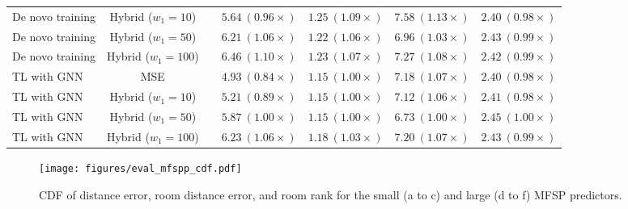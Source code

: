 \begin{table*}[h!]
\begin{tabular}{lcccccc}
        De novo training  & Hybrid ($w_1=10$) &                        & $5.64~(0.96\times)$ & $1.25~(1.09\times)$ & $7.58~(1.13\times)$ & $2.40~(0.98\times)$ \\ %
        De novo training  & Hybrid ($w_1=50$) &                        & $6.21~(1.06\times)$ & $1.22~(1.06\times)$ & $6.96~(1.03\times)$ & $2.43~(0.99\times)$ \\ %
        De novo training  & Hybrid ($w_1=100$)&                        & $6.46~(1.10\times)$ & $1.23~(1.07\times)$ & $7.27~(1.08\times)$ & $2.42~(0.99\times)$ \\ %
        TL with GNN       & MSE               &                        & $\mathbf{4.93~(0.84\times)}$ & $\mathbf{1.15~(1.00\times)}$ & $7.18~(1.07\times)$ & $2.40~(0.98\times)$ \\ %
        TL with GNN       & Hybrid ($w_1=10$) &                        & $5.21~(0.89\times)$ & $\mathbf{1.15~(1.00\times)}$ & $7.12~(1.06\times)$ & $2.41~(0.98\times)$ \\ %
        TL with GNN       & Hybrid ($w_1=50$) &                        & $5.87~(1.00\times)$ & $\mathbf{1.15~(1.00\times)}$ & $\mathbf{6.73~(1.00\times)}$ & $\mathbf{2.45~(1.00\times)}$ \\ %
        TL with GNN       & Hybrid ($w_1=100$)&                        & $6.23~(1.06\times)$ & $1.18~(1.03\times)$ & $7.20~(1.07\times)$ & $2.43~(0.99\times)$ \\ %
        \bottomrule
    \end{tabular}
    \label{tab:mfspp_eval}
\end{table*}
\begin{figure*}[h!]
    \texttt{[image: figures/eval\_mfspp\_cdf.pdf]}
    \caption{CDF of distance error, room distance error, and room rank for the small (a to c) and large (d to f) MFSP predictors.}
    \label{fig:eval_mfspp_cdf} 
\end{figure*}


